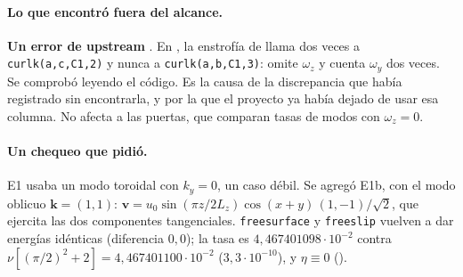 \paragraph{Lo que encontró fuera del alcance.} \textbf{Un error de upstream}
. En , la enstrofía de
 llama dos veces a \texttt{curlk(a,c,C1,2)} y nunca a
\texttt{curlk(a,b,C1,3)}: omite $\omega_z$ y cuenta $\omega_y$ dos veces. Se comprobó leyendo
el código. Es la causa de la discrepancia que  había registrado sin encontrarla, y
por la que el proyecto ya había dejado de usar esa columna. No afecta a las puertas, que
comparan tasas de modos con $\omega_z=0$.

\paragraph{Un chequeo que pidió.} E1 usaba un modo toroidal con $k_y=0$, un caso débil. Se
agregó E1b, con el modo oblicuo $\mathbf k=(1,1)$:
$\mathbf v=u_0\sin(\pi z/2L_z)\cos(x+y)\,(1,-1)/\sqrt2$, que ejercita las dos
componentes tangenciales. \texttt{freesurface} y \texttt{freeslip} vuelven a dar energías
idénticas (diferencia $0{,}0$); la tasa es $4{,}467401098\cdot10^{-2}$ contra
$\nu[(\pi/2)^2+2]=4{,}467401100\cdot10^{-2}$ ($3{,}3\cdot10^{-10}$), y $\eta\equiv0$
().
